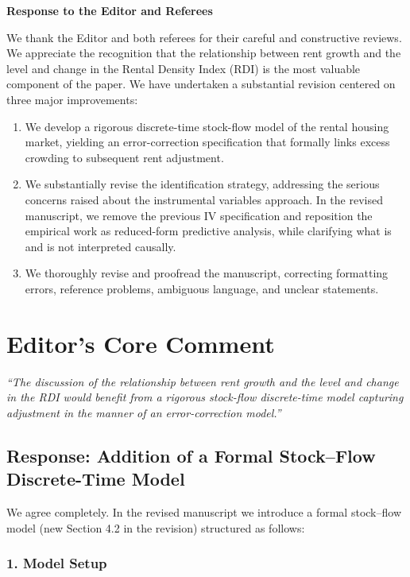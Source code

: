 \documentclass[12pt]{article}
\begin{document}
\begin{center}
\Large \textbf{Response to the Editor and Referees}
\end{center}

\bigskip

We thank the Editor and both referees for their careful and constructive reviews. We appreciate the recognition that the relationship between rent growth and the level and change in the Rental Density Index (RDI) is the most valuable component of the paper. We have undertaken a substantial revision centered on three major improvements:

\begin{enumerate}
\item We develop a rigorous discrete-time stock-flow model of the rental housing market, yielding an error-correction specification that formally links excess crowding to subsequent rent adjustment.
\item We substantially revise the identification strategy, addressing the serious concerns raised about the instrumental variables approach. In the revised manuscript, we remove the previous IV specification and reposition the empirical work as reduced-form predictive analysis, while clarifying what is and is not interpreted causally.
\item We thoroughly revise and proofread the manuscript, correcting formatting errors, reference problems, ambiguous language, and unclear statements.
\end{enumerate}

\section*{Editor’s Core Comment}

\textit{“The discussion of the relationship between rent growth and the level and change in the RDI would benefit from a rigorous stock-flow discrete-time model capturing adjustment in the manner of an error-correction model.”}

\subsection*{Response: Addition of a Formal Stock--Flow Discrete-Time Model}

We agree completely. In the revised manuscript we introduce a formal stock--flow model (new Section 4.2 in the revision) structured as follows:

\subsubsection*{1. Model Setup}
\end{document}
